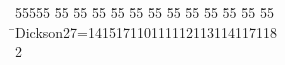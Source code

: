 %
%
\begin{tabbing}
55555 \= 55 \= 55 \= 55 \= 55 \= 55 \= 55 \= 55 \= 55 \= 55 \= 55 \= 55 \= 55 \= \>Dickson27=141517110111112113114117118\\[0pt]
2\>\end{tabbing}
